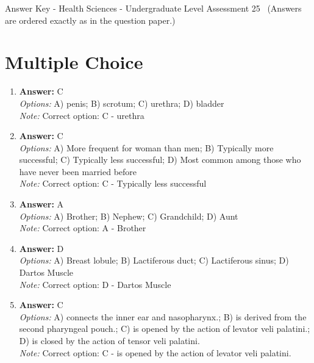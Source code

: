 \documentclass[12pt]{article}
\begin{document}
\begin{center}
Answer Key - Health Sciences - Undergraduate Level Assessment 25 \
\small (Answers are ordered exactly as in the question paper.)
\end{center}

\section*{Multiple Choice}
\begin{enumerate}[label=\arabic*.]
\item \textbf{Answer:} C
\\ \textit{Options:} A) penis; B) scrotum; C) urethra; D) bladder
\\ \textit{Note:} Correct option: C - urethra
\item \textbf{Answer:} C
\\ \textit{Options:} A) More frequent for woman than men; B) Typically more successful; C) Typically less successful; D) Most common among those who have never been married before
\\ \textit{Note:} Correct option: C - Typically less successful
\item \textbf{Answer:} A
\\ \textit{Options:} A) Brother; B) Nephew; C) Grandchild; D) Aunt
\\ \textit{Note:} Correct option: A - Brother
\item \textbf{Answer:} D
\\ \textit{Options:} A) Breast lobule; B) Lactiferous duct; C) Lactiferous sinus; D) Dartos Muscle
\\ \textit{Note:} Correct option: D - Dartos Muscle
\item \textbf{Answer:} C
\\ \textit{Options:} A) connects the inner ear and nasopharynx.; B) is derived from the second pharyngeal pouch.; C) is opened by the action of levator veli palatini.; D) is closed by the action of tensor veli palatini.
\\ \textit{Note:} Correct option: C - is opened by the action of levator veli palatini.
\end{enumerate}
\end{document}
